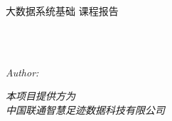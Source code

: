 \documentclass[
11pt, %
english, %
singlespacing, %
headsepline, %
]{MastersDoctoralThesis} %
\author{肖飞宇\quad牛苒\quad荆科\quad沈磊\quad韦承志\quad赵嘉欣\quad张玉生\quad李思琪
 } %
\begin{document}
\frontmatter %

\pagestyle{plain} %


\begin{titlepage}
\begin{center}

\vspace*{.06\textheight}
{\scshape\LARGE \univname\par}\vspace{1.5cm} %
\textsc{\LARGE 大数据系统基础 课程报告}\\[0.5cm] %

\HRule \\[0.4cm] %
{\huge \bfseries \ttitle\par}\vspace{0.4cm} %
\HRule \\[1.5cm] %
 
\begin{minipage}[t]{0.4\textwidth}
\begin{flushleft} \large
\emph{Author:}\\
\href{https://github.com/BigDataSystemTHU2018/Project-Unicom}{\authorname} %
\end{flushleft}
\end{minipage}

 
\vfill

\Large \textit{本项目提供方为} \\ \textit{中国联通智慧足迹数据科技有限公司}\\[1cm] %

 
\vfill


 
\vfill
\end{center}
\end{titlepage}

\end{document}
